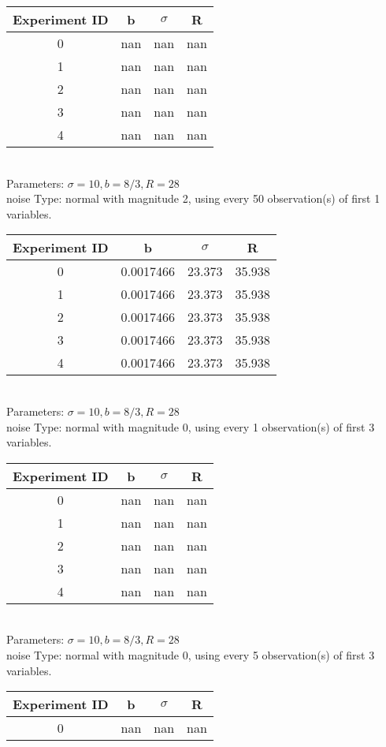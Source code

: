 \begin{multicols}{3}
\begin{tabular}{cccc}
\hline Experiment ID & b & $\sigma$ & R \\ \hline 
0 & nan & nan & nan\\ \hline 
 1 & nan & nan & nan\\ \hline 
 2 & nan & nan & nan\\ \hline 
 3 & nan & nan & nan\\ \hline 
 4 & nan & nan & nan\\ \hline 
 \end{tabular}\\
Parameters: $\sigma=10, b=8/3, R=28$\\
noise Type: normal with magnitude 2, using every 50 observation(s) of first 1 variables.\\
\begin{tabular}{cccc}
\hline Experiment ID & b & $\sigma$ & R \\ \hline 
0 & 0.0017466 & 23.373 & 35.938\\ \hline 
 1 & 0.0017466 & 23.373 & 35.938\\ \hline 
 2 & 0.0017466 & 23.373 & 35.938\\ \hline 
 3 & 0.0017466 & 23.373 & 35.938\\ \hline 
 4 & 0.0017466 & 23.373 & 35.938\\ \hline 
 \end{tabular}\\
Parameters: $\sigma=10, b=8/3, R=28$\\
noise Type: normal with magnitude 0, using every 1 observation(s) of first 3 variables.\\
\begin{tabular}{cccc}
\hline Experiment ID & b & $\sigma$ & R \\ \hline 
0 & nan & nan & nan\\ \hline 
 1 & nan & nan & nan\\ \hline 
 2 & nan & nan & nan\\ \hline 
 3 & nan & nan & nan\\ \hline 
 4 & nan & nan & nan\\ \hline 
 \end{tabular}\\
Parameters: $\sigma=10, b=8/3, R=28$\\
noise Type: normal with magnitude 0, using every 5 observation(s) of first 3 variables.\\
\begin{tabular}{cccc}
\hline Experiment ID & b & $\sigma$ & R \\ \hline 
0 & nan & nan & nan\\ \hline 

\end{tabular}
\end{multicols}
